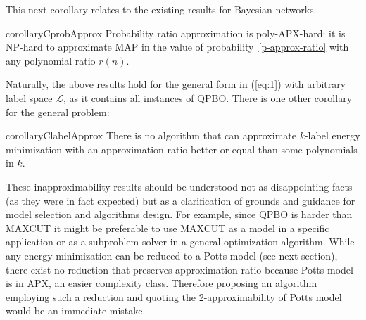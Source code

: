 This next corollary relates to the existing results for Bayesian networks.
\begin{restatable}{corollary}{CprobApprox}\label{C:prob-approx}
Probability ratio approximation is poly-APX-hard: it is NP-hard to approximate MAP in the value of probability~\eqref{p-approx-ratio} with any polynomial ratio $r(n)$.
\end{restatable}

Naturally, the above results hold for the general form in (\ref{eq:1}) with arbitrary label space $\mathcal{L}$, as it contains all instances of QPBO.
There is one other corollary for the general problem:

\begin{restatable}{corollary}{ClabelApprox}\label{C:label-approx}
There is no algorithm that can approximate $k$-label energy minimization with an approximation ratio better or equal than some polynomials in $k$.
\end{restatable}
\par
\par
These inapproximability results should be understood not as disappointing facts (as they were in fact expected) but as a clarification of grounds and guidance for model selection and algorithms design. For example, since QPBO is harder than MAXCUT it might be preferable to use MAXCUT as a model in a specific application or as a subproblem solver in a general optimization algorithm. While any energy minimization can be reduced to a Potts model (see next section), there exist no reduction that preserves approximation ratio because Potts model is in APX, an easier complexity class. Therefore proposing an algorithm employing such a reduction and quoting the 2-approximability of Potts model would be an immediate mistake.
%
%
%



